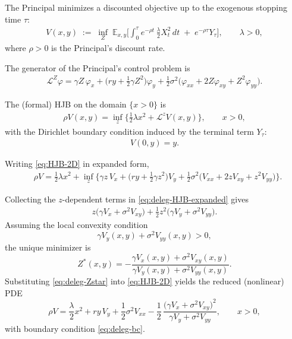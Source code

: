 \documentclass[a4paper,10pt]{article}
\theoremstyle{definition}
\theoremstyle{plain}
\numberwithin{equation}{section}
\newcommand{\hs}{\vspace{3mm}}
\begin{document}
\hs

The Principal minimizes a discounted objective up to the exogenous stopping time $\tau$:
\begin{align}\label{eq:V-def}
V(x,y)
\;:=\;
\inf_{Z}\;
\mathbb{E}_{x,y}\Big[
\int_0^\tau  e^{-\rho t}\,\frac{\lambda}{2}X_t^2\,dt
\;+\;
e^{-\rho \tau}Y_\tau
\Big],
\qquad \lambda>0,
\end{align}
where $\rho>0$ is the Principal's discount rate.

\hs

The generator  of the Principal's control problem  is
\begin{align}\label{eq:generator}
\mathcal{L}^{Z}\varphi = \gamma Z\,\varphi_x +
\Big(ry+\tfrac{1}{2} \gamma  Z^2\Big)\varphi_y +
\frac{1}{2}\sigma^2 \Big(\varphi_{xx} + 2 Z \varphi_{xy}+Z^2\varphi_{yy}\Big).
\end{align}

The (formal) HJB on the domain $\{x>0\}$ is
\begin{align} \label{eq:HJB-2D}
\rho V(x,y) = \inf_{z} \Big\{ \frac12 \lambda  x^2 + \mathcal{L}^{z}V(x,y) \Big\},
\qquad x>0,
\end{align}
with the Dirichlet boundary condition induced by the terminal term $Y_\tau$:
\begin{align} \label{eq:deleg-bc}
V(0,y)=y.
\end{align}

\hs

 
Writing \eqref{eq:HJB-2D} in expanded form,
\begin{align}\label{eq:deleg-HJB-expanded}
&\rho V  = \frac12  \lambda  x^2 + \inf_{z}\Big\{
 \gamma z\,V_x + \Big(ry + \frac12 \gamma z^2\Big)V_y  
+\frac12\sigma^2\Big(V_{xx} + 2 z V_{xy} + z^2 V_{yy}\Big) \Big\}.
\end{align}

\hs

Collecting the $z$-dependent terms in \eqref{eq:deleg-HJB-expanded} gives
\begin{align*}
z\Big(\gamma V_x+\sigma^2V_{xy}\Big)  +  \frac12 z^2\Big(\gamma V_y+\sigma^2V_{yy}\Big).
\end{align*}
Assuming the local convexity condition
\begin{equation}
\label{eq:deleg-convexity}
\gamma V_y(x,y)+\sigma^2V_{yy}(x,y)>0,
\end{equation}
the unique minimizer is
\begin{equation}
\label{eq:deleg-Zstar}
Z^*(x,y)=
-\frac{\gamma V_x(x,y)+\sigma^2V_{xy}(x,y)}
{\gamma V_y(x,y)+\sigma^2V_{yy}(x,y)}.
\end{equation}
Substituting \eqref{eq:deleg-Zstar} into \eqref{eq:HJB-2D} yields the reduced (nonlinear) PDE
\begin{equation}
\label{eq:deleg-PDE-reduced}
\rho V
=
\frac{\lambda}{2}x^2
+
r y\,V_y
+
\frac12\sigma^2 V_{xx}
-
\frac12\,
\frac{\big(\gamma V_x+\sigma^2V_{xy}\big)^2}
{\gamma V_y+\sigma^2V_{yy}},
\qquad x>0,
\end{equation}
with boundary condition \eqref{eq:deleg-bc}.
\end{document}
